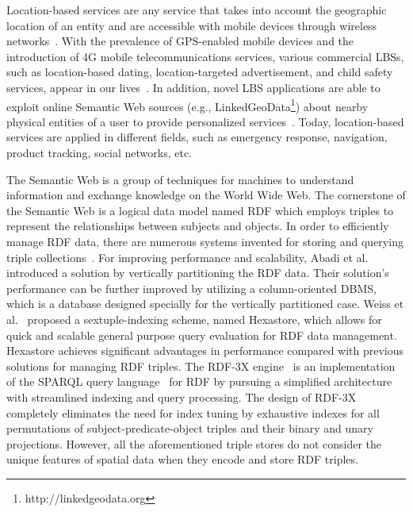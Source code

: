 Location-based services are any service that takes into account
the geographic location of an entity and are accessible with
mobile devices through wireless
networks~\cite{journals/cacm/JunglasW08}. With the prevalence of
GPS-enabled mobile devices and the introduction of 4G mobile
telecommunications services, various commercial LBSs, such as
location-based dating, location-targeted advertisement, and child
safety services, appear in our
lives~\cite{journals/pervasive/BellavistaKH08}. In addition, novel
LBS applications are able to exploit online Semantic Web sources
(e.g., LinkedGeoData\footnote{http://linkedgeodata.org}) about
nearby physical entities of a user to provide personalized
services~\cite{journals/internet/WoenselCPT11}. Today,
location-based services are applied in different fields, such as
emergency response, navigation, product tracking, social networks,
etc.



The Semantic Web is a group of techniques for machines to
understand information and exchange knowledge on the World Wide
Web. The cornerstone of the Semantic Web is a logical data model
named RDF which employs triples to represent the relationships
between subjects and objects. In order to efficiently manage RDF
data, there are numerous systems invented for storing and querying
triple
collections~\cite{conf/www/CarrollDDRSW04,conf/vldb/ChongDES05,conf/vldb/AbadiMMH07,
journals/pvldb/WeissKB08,journals/vldb/NeumannW10}. For improving
performance and scalability, Abadi et
al.~\cite{conf/vldb/AbadiMMH07} introduced a solution by
vertically partitioning the RDF data. Their solution's performance
can be further improved by utilizing a column-oriented DBMS, which
is a database designed specially for the vertically partitioned
case. Weiss et al.~\cite{journals/pvldb/WeissKB08} proposed a
sextuple-indexing scheme, named Hexastore, which allows for quick
and scalable general purpose query evaluation for RDF data
management. Hexastore achieves significant advantages in
performance compared with previous solutions for managing RDF
triples. The RDF-3X engine~\cite{journals/vldb/NeumannW10} is an
implementation of the SPARQL query language~\cite{SPARQL} for RDF
by pursuing a simplified architecture with streamlined indexing
and query processing. The design of RDF-3X completely eliminates
the need for index tuning by exhaustive indexes for all
permutations of subject-predicate-object triples and their binary
and unary projections. However, all the aforementioned triple
stores do not consider the unique features of spatial data when
they encode and store RDF triples.

